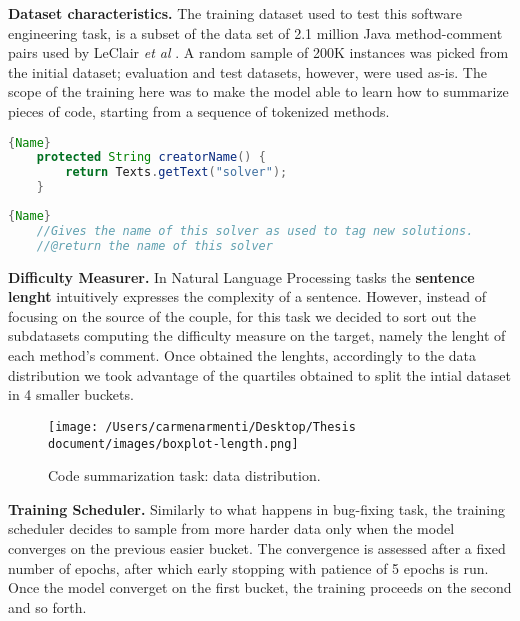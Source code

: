 \textbf{Dataset characteristics.} The training dataset used to test this software engineering task, is a subset of the data set of 2.1 million 
Java method-comment pairs used by LeClair \textit{et al} \cite{Leclair2020}. A random sample of 200K instances was picked from
the initial dataset; evaluation and test datasets, however, were used as-is. The scope of the training here 
was to make the model able to learn how to summarize pieces of code, starting from a sequence of tokenized methods.

\begin{lstlisting}[language=Java, caption={Function},label={lst:buggy1}, mathescape=true, breaklines=true]{Name}
    protected String creatorName() {
        return Texts.getText("solver");
    }
\end{lstlisting}

\begin{lstlisting}[language=Java, caption={Comment},label={lst:fixed1}, mathescape=true, breaklines=true]{Name}
    //Gives the name of this solver as used to tag new solutions.
    //@return the name of this solver
\end{lstlisting}



\textbf{Difficulty Measurer.} In Natural Language Processing tasks the \textbf{sentence lenght} intuitively expresses the complexity 
of a sentence. However, instead of focusing on the source of the couple, for this task we decided to sort out the subdatasets computing the
difficulty measure on the target, namely the lenght of each method's comment. 
Once obtained the lenghts, accordingly to the data distribution we took advantage of the quartiles obtained to split the intial dataset in 4 smaller 
buckets. 
\begin{figure}[h!]
    \begin{center}
        \texttt{[image: /Users/carmenarmenti/Desktop/Thesis document/images/boxplot-length.png]}
        \caption{\label{fig:CSdistribution}Code summarization task: data distribution.}
    \end{center}
\end{figure}

\textbf{Training Scheduler.} Similarly to what happens in bug-fixing task, the training scheduler decides to sample from more harder data only when the model converges on the 
previous easier bucket. The convergence is assessed after a fixed number of epochs, after which early stopping with patience of 5 epochs
is run. Once the model converget on the first bucket, the training proceeds on the second and so forth. 

